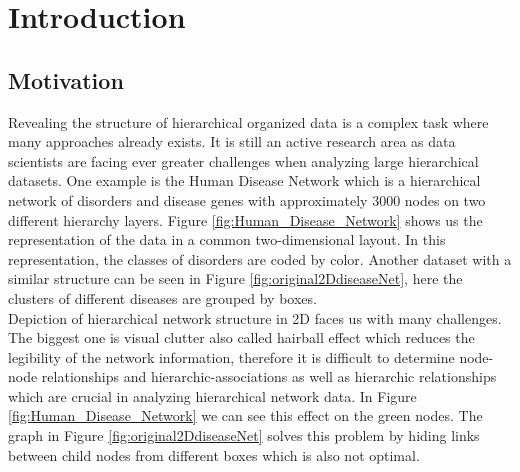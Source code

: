 \chapter{Introduction}

\section{Motivation}
Revealing the structure of hierarchical organized data is a complex task where many approaches already exists. It is still an active research area as data scientists are facing ever greater challenges when analyzing large hierarchical datasets. One example is the Human Disease Network \cite{zhou_human_2014} which is a hierarchical network of disorders and disease genes with approximately 3000 nodes on two different hierarchy layers. Figure \ref{fig:Human_Disease_Network} shows us the representation of the data in a common two-dimensional layout. In this representation, the classes of disorders are coded by color. 
Another dataset with a similar structure can be seen in Figure \ref{fig:original2DdiseaseNet}, here the clusters of different diseases are grouped by boxes.\\ 
Depiction of hierarchical network structure in 2D faces us with many challenges. The biggest one is visual clutter also called hairball effect which reduces the legibility of the network information, therefore it is difficult to determine node-node relationships and hierarchic-associations as well as hierarchic relationships which are crucial in analyzing hierarchical network data. In Figure \ref{fig:Human_Disease_Network} we can see this effect on the green nodes. The graph in Figure \ref{fig:original2DdiseaseNet} solves this problem by hiding links between child nodes from different boxes which is also not optimal.

